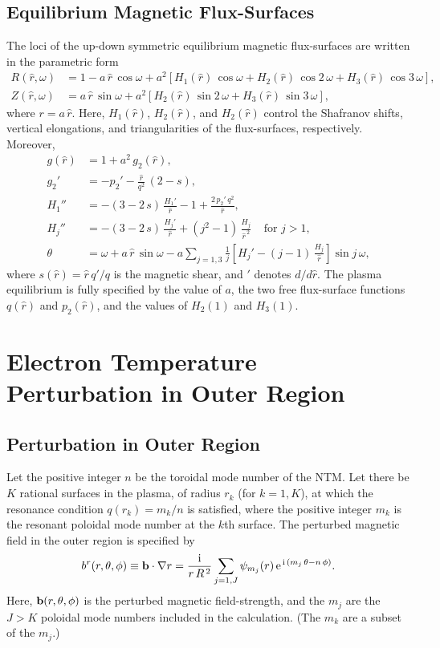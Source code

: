 \documentclass[12pt,prb,aps]{revtex4-1}
\begin{document}
\subsection{Equilibrium Magnetic Flux-Surfaces}
The loci of the up-down symmetric equilibrium magnetic flux-surfaces are written in the parametric form\,\cite{tear5}
\begin{align}
R(\hat{r},\omega) &= 1 -a\,\hat{r}\,\cos\omega + a^{2}\left[H_1(\hat{r})\,\cos \omega + H_2(\hat{r})\,\cos 2\,\omega+H_3(\hat{r})\,\cos 3\,\omega\right], \label{e19x}\\[0.5ex]
Z(\hat{r},\omega)&= a\,\hat{r}\,\sin\omega +a^{2}\left[H_2(\hat{r})\,\sin 2\,\omega+H_3(\hat{r})\,\sin 3\,\omega\right], \label{e20x}
\end{align}
where  $r=a\,\hat{r}$. 
Here, $H_1(\hat{r})$, $H_2(\hat{r})$, and $H_2(\hat{r})$ control the Shafranov shifts, vertical elongations, and  triangularities of
the flux-surfaces, respectively. 
Moreover,\cite{exp}
\begin{align}
g(\hat{r}) &= 1+ a^2\,g_2(\hat{r}),\\[0.5ex]
g_2'&= -p_2' - \frac{\hat{r}}{q^2}\,(2-s),\\[0.5ex]
H_1''&= -(3-2\,s)\,\frac{H_1' }{\hat{r}}-1+\frac{2\,p_2'\,q^2}{\hat{r}},\label{e27}\\[0.5ex]
H_j''&= -(3-2\,s)\,\frac{H_j'}{\hat{r}}+(j^2-1)\,\frac{H_j}{\hat{r}^{\,2}}~~~~~\mbox{for $j>1$},\label{e33x}\\[0.5ex]
\theta &= \omega+a\,\hat{r}\,\sin\omega - a\sum_{j=1,3}\frac{1}{j}\left[H_j'-(j-1)\,\frac{H_j}{\hat{r}}\right]\sin j\,\omega,
\end{align}
where $s(\hat{r}) = \hat{r}\,q'/q$ is the magnetic shear, and $'$ denotes $d/d\hat{r}$. The plasma equilibrium is fully specified by the value of $a$, the two free
flux-surface functions $q(\hat{r})$ and $p_2(\hat{r})$, and the values of $H_2(1)$ and $H_3(1)$. 

\section{Electron Temperature Perturbation in Outer Region}
\subsection{Perturbation in Outer Region}
Let the positive integer $n$ be the toroidal mode number of the NTM. Let there be $K$ rational surfaces in the plasma, of radius $r_k$ (for $k=1,K$),  at which the resonance condition
$q(r_k) = m_k/n$ is satisfied, where the positive integer $m_k$ is the resonant poloidal mode number at the $k$th surface. The perturbed magnetic field in the outer region is specified by\,\cite{tear9,tear10}
\begin{equation}
b^r(r,\theta,\phi)\equiv {\bf b}\cdot\nabla r = \frac{{\rm i}}{r\,R^{\,2}}\sum_{j=1,J} \psi_{m_j}(r)\,{\rm e}^{\,{\rm i}\,(m_j\,\theta-n\,\phi)}.
\end{equation}
Here, ${\bf b}(r,\theta,\phi)$ is the perturbed magnetic field-strength, and the $m_j$ are the  $J>K$ poloidal mode numbers included in the calculation. (The $m_k$ are a subset of the $m_j$.) 
\end{document}
